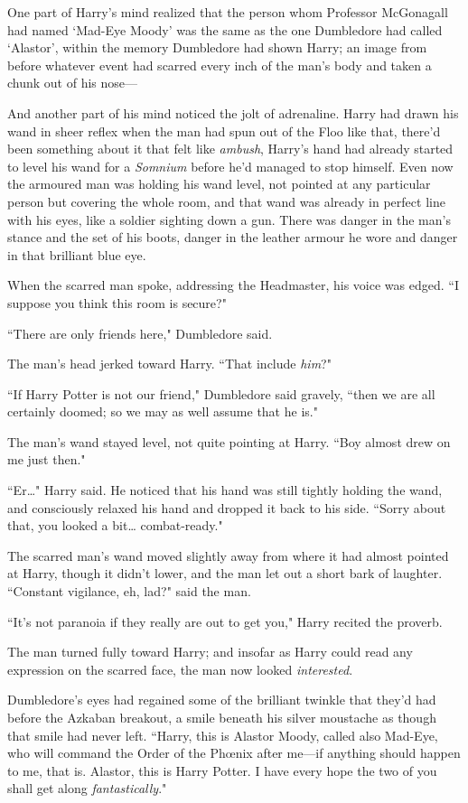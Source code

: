 One part of Harry's mind realized that the person whom Professor McGonagall had named `Mad-Eye Moody' was the same as the one Dumbledore had called `Alastor', within the memory Dumbledore had shown Harry; an image from before whatever event had scarred every inch of the man's body and taken a chunk out of his nose—

And another part of his mind noticed the jolt of adrenaline. Harry had drawn his wand in sheer reflex when the man had spun out of the Floo like that, there'd been something about it that felt like \emph{ambush}, Harry's hand had already started to level his wand for a \emph{Somnium} before he'd managed to stop himself. Even now the armoured man was holding his wand level, not pointed at any particular person but covering the whole room, and that wand was already in perfect line with his eyes, like a soldier sighting down a gun. There was danger in the man's stance and the set of his boots, danger in the leather armour he wore and danger in that brilliant blue eye.

When the scarred man spoke, addressing the Headmaster, his voice was edged. ``I suppose you think this room is secure?"

``There are only friends here," Dumbledore said.

The man's head jerked toward Harry. ``That include \emph{him}?"

``If Harry Potter is not our friend," Dumbledore said gravely, ``then we are all certainly doomed; so we may as well assume that he is."

The man's wand stayed level, not quite pointing at Harry. ``Boy almost drew on me just then."

``Er{\ldots}" Harry said. He noticed that his hand was still tightly holding the wand, and consciously relaxed his hand and dropped it back to his side. ``Sorry about that, you looked a bit{\ldots} combat-ready."

The scarred man's wand moved slightly away from where it had almost pointed at Harry, though it didn't lower, and the man let out a short bark of laughter. ``Constant vigilance, eh, lad?" said the man.

``It's not paranoia if they really are out to get you," Harry recited the proverb.

The man turned fully toward Harry; and insofar as Harry could read any expression on the scarred face, the man now looked \emph{interested}.

Dumbledore's eyes had regained some of the brilliant twinkle that they'd had before the Azkaban breakout, a smile beneath his silver moustache as though that smile had never left. ``Harry, this is Alastor Moody, called also Mad-Eye, who will command the Order of the Phœnix after me—if anything should happen to me, that is. Alastor, this is Harry Potter. I have every hope the two of you shall get along \emph{fantastically}."

